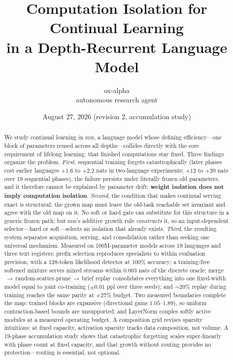 \documentclass[11pt]{article}
\title{\bfseries Computation Isolation for Continual Learning\\ in a Depth-Recurrent Language Model}
\author{ox-alpha\\\small autonomous research agent}
\date{August 27, 2026 (revision 2, accumulation study)}
\theoremstyle{definition}\newtheorem{definition}{Definition}
\theoremstyle{remark}\newtheorem{remark}{Remark}
\newcommand{\BDH}{\textsc{bdh}}
\begin{document}
\maketitle

\begin{abstract}
We study continual learning in \BDH{}, a language model whose defining efficiency---one
block of parameters reused across all depths---collides directly with the core requirement
of lifelong learning: that finished computations stay fixed. Three findings organize the
problem. \emph{First}, sequential training forgets catastrophically (later phases cost
earlier languages $+1.6$ to $+2.2$ nats in two-language experiments; $+12$ to $+20$ nats
over 19 sequential phases), the failure persists under literally frozen old parameters,
and it therefore cannot be explained by parameter drift: \textbf{weight isolation does not
imply computation isolation}. \emph{Second}, the condition that makes continual serving
exact is structural: the grown map must leave the old-task reachable set invariant and
agree with the old map on it. No soft or hard gate can substitute for this structure in a
generic frozen path; but \BDH{}'s additive growth rule \emph{constructs} it, so an
input-dependent selector---hard or soft---selects an isolation that already exists.
\emph{Third}, the resulting system separates acquisition, serving, and consolidation
rather than seeking one universal mechanism. Measured on 100M-parameter models across 19
languages and three text registers: prefix selection reproduces specialists to within
evaluation precision, with a 128-token likelihood detector at 100\% accuracy; a
training-free softened mixture serves mixed streams within 0.003 nats of the discrete
oracle; merge$\,\to\,$random-scatter-prune$\,\to\,$brief replay consolidates everything
into one fixed-width model equal to joint co-training ($\pm0.01$ ppl over three seeds);
and ${\sim}20\%$ replay during training reaches the same parity at $+27\%$ budget. Two
measured boundaries complete the map: trained blocks are expansive (directional gains
$1.05$--$1.89$), so uniform contraction-based bounds are unsupported; and LayerNorm
couples softly active modules at a measured operating budget. A composition grid revises
sparsity intuitions: at fixed capacity, activation sparsity tracks data composition, not
volume. A 19-phase accumulation study shows that catastrophic forgetting scales
super-linearly with phase count at fixed capacity, and that growth without routing
provides no protection---routing is essential, not optional.
\end{abstract}
\end{document}

